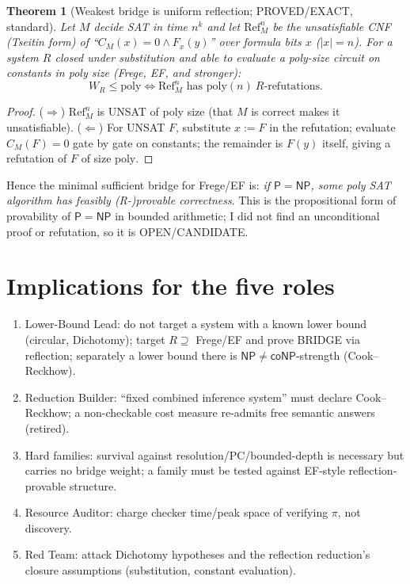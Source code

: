 \documentclass{article}\usepackage{amsmath,amssymb,amsthm}
\newtheorem{thm}{Theorem}\newtheorem{prop}{Proposition}\newtheorem{cor}{Corollary}
\begin{document}
\begin{thm}[Weakest bridge is uniform reflection; PROVED/EXACT, standard]
Let $M$ decide SAT in time $n^k$ and let $\mathrm{Ref}^n_M$ be the unsatisfiable CNF (Tseitin form) of ``$C_M(x)=0\wedge F_x(y)$'' over formula bits $x$ ($|x|=n$). For a system $R$ closed under substitution and able to evaluate a poly-size circuit on constants in poly size (Frege, EF, and stronger):
\[ W_R\le\mathrm{poly}\iff \mathrm{Ref}^n_M \text{ has } \mathrm{poly}(n)\ R\text{-refutations.}\]
\end{thm}
\begin{proof}($\Rightarrow$) $\mathrm{Ref}^n_M$ is UNSAT of poly size (that $M$ is correct makes it unsatisfiable). ($\Leftarrow$) For UNSAT $F$, substitute $x:=F$ in the refutation; evaluate $C_M(F)=0$ gate by gate on constants; the remainder is $F(y)$ itself, giving a refutation of $F$ of size $\mathrm{poly}$.\end{proof}
\noindent Hence the minimal sufficient bridge for Frege/EF is: \emph{if $\mathsf P=\mathsf{NP}$, some poly SAT algorithm has feasibly (R-)provable correctness}. This is the propositional form of provability of $\mathsf P=\mathsf{NP}$ in bounded arithmetic; I did not find an unconditional proof or refutation, so it is OPEN/CANDIDATE.

\section*{Implications for the five roles}
\begin{enumerate}
\item Lower-Bound Lead: do not target a system with a known lower bound (circular, Dichotomy); target $R\supseteq$ Frege/EF and prove BRIDGE via reflection; separately a lower bound there is $\mathsf{NP}\ne\mathsf{coNP}$-strength (Cook--Reckhow).
\item Reduction Builder: ``fixed combined inference system'' must declare Cook--Reckhow; a non-checkable cost measure re-admits free semantic answers (retired).
\item Hard families: survival against resolution/PC/bounded-depth is necessary but carries no bridge weight; a family must be tested against EF-style reflection-provable structure.
\item Resource Auditor: charge checker time/peak space of verifying $\pi$, not discovery.
\item Red Team: attack Dichotomy hypotheses and the reflection reduction's closure assumptions (substitution, constant evaluation).
\end{enumerate}
\end{document}
